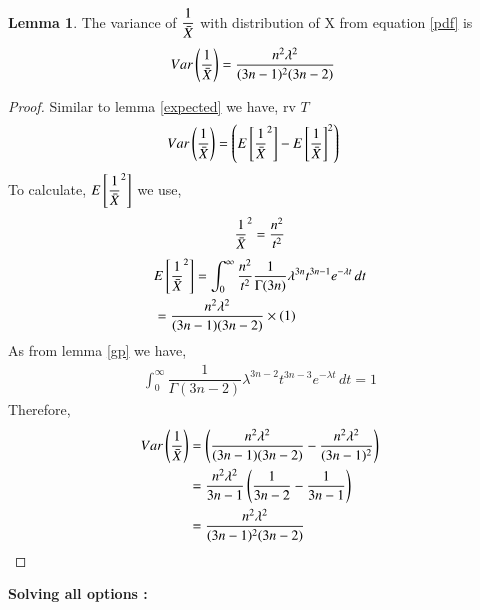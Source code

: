 \documentclass[journal,12pt,twocolumn]{IEEEtran}
\theoremstyle{definition}
\newtheorem{lemma}[theorem]{Lemma}
\begin{document}
\begin{lemma}
\label{varxbar}
The variance of $ \dfrac{1}{\Bar{X}} $ with distribution of X from equation \eqref{pdf} is
\begin{align}
    Var\left(\dfrac{1}{\Bar{X}}\right) &= \dfrac{n^2\lambda^2}{(3n-1)^2(3n-2)}
\end{align}
\end{lemma}
\begin{proof}
 Similar to lemma \ref{expected} we have, rv $ T$
 \begin{align}
   Var\left(\dfrac{1}{\Bar{X}}\right)    &=  \left( E \left[   {\dfrac{1}{\Bar{X}}}^2  \right] - { E \left[   \dfrac{1}{\Bar{X}}  \right]}^2\right)
 \end{align}
 To calculate, $E \left[   {\dfrac{1}{\Bar{X}}}^2  \right] $ we use,
 \begin{align}
      {\dfrac{1}{\Bar{X}}}^2 = \dfrac{n^2}{t^2}
 \end{align}
 \begin{align}
    &  E \left[   {\dfrac{1}{\Bar{X}}}^2  \right] = \int_{0}^{\infty} \dfrac{n^2}{t^2} \dfrac{1}{\Gamma(3n)} \lambda^{3n}t^{3n-1}e^{-\lambda t}\,dt \\
      &= \dfrac{n^2\lambda^2}{(3n-1)(3n-2)} \times (1)
 \end{align}
 As from lemma \ref{gp} we have,
 \begin{align}
     \int_{0}^{\infty} \dfrac{1}{\Gamma(3n-2)} \lambda^{3n-2}t^{3n-3}e^{-\lambda t}\,dt = 1
 \end{align}
Therefore,
\begin{align}
    Var\left(\dfrac{1}{\Bar{X}}\right) &= \left(\dfrac{n^2\lambda^2}{(3n-1)(3n-2)} - \dfrac{n^2\lambda^2}{(3n-1)^2}\right) \\
    &= \dfrac{n^2\lambda^2}{3n-1} \left(\dfrac{1}{3n-2}- \dfrac{1}{3n-1}\right) \\
    &= \dfrac{n^2\lambda^2}{(3n-1)^2(3n-2)}
\end{align}
\end{proof}
\textbf{Solving all options : }
\end{document}
